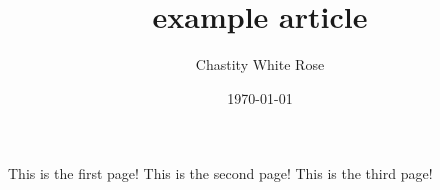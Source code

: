 \documentclass{article}
\title{example article}
\date{\today}
\author{Chastity White Rose}
\begin{document}
\maketitle
\newpage
This is the first page!
\newpage
This is the second page!
\newpage
This is the third page!
\end{document}

